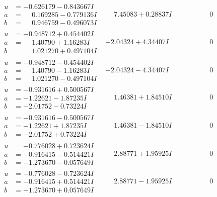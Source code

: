 \documentclass[1p]{elsarticle_modified}
\theoremstyle{definition}
\begin{document}
$$\begin{array}{c|c|c}
\begin{aligned}
u &= -0.626179 - 0.843667 I \\
a &= \phantom{-}0.169285 - 0.779136 I \\
b &= \phantom{-}0.946759 - 0.496073 I\end{aligned}
 & \phantom{-}7.45083 + 0.28837 I & \phantom{-0.000000 } 0 \\ \hline\begin{aligned}
u &= -0.948712 + 0.454402 I \\
a &= \phantom{-}1.40790 + 1.16283 I \\
b &= \phantom{-}1.021270 + 0.497104 I\end{aligned}
 & -2.04324 + 4.34407 I & \phantom{-0.000000 } 0 \\ \hline\begin{aligned}
u &= -0.948712 - 0.454402 I \\
a &= \phantom{-}1.40790 - 1.16283 I \\
b &= \phantom{-}1.021270 - 0.497104 I\end{aligned}
 & -2.04324 - 4.34407 I & \phantom{-0.000000 } 0 \\ \hline\begin{aligned}
u &= -0.931616 + 0.500567 I \\
a &= -1.22621 - 1.87235 I \\
b &= -2.01752 - 0.73224 I\end{aligned}
 & \phantom{-}1.46381 + 1.84510 I & \phantom{-0.000000 } 0 \\ \hline\begin{aligned}
u &= -0.931616 - 0.500567 I \\
a &= -1.22621 + 1.87235 I \\
b &= -2.01752 + 0.73224 I\end{aligned}
 & \phantom{-}1.46381 - 1.84510 I & \phantom{-0.000000 } 0 \\ \hline\begin{aligned}
u &= -0.776028 + 0.723624 I \\
a &= -0.916415 - 0.514421 I \\
b &= -1.273670 - 0.057649 I\end{aligned}
 & \phantom{-}2.88771 + 1.95925 I & \phantom{-0.000000 } 0 \\ \hline\begin{aligned}
u &= -0.776028 - 0.723624 I \\
a &= -0.916415 + 0.514421 I \\
b &= -1.273670 + 0.057649 I\end{aligned}
 & \phantom{-}2.88771 - 1.95925 I & \phantom{-0.000000 } 0 \\ \hline\begin{aligned}

\end{aligned}
\end{array}$$
\end{document}
